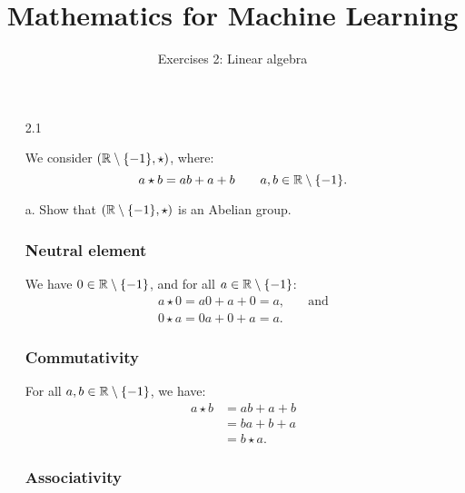 \documentclass[11pt]{article}
\title{Mathematics for Machine Learning}
\subtitle{Exercises 2: Linear algebra}
\author{}
\date{}
\begin{document}
\maketitle

\vspace{-6em}
\begin{figure}[h]
    \centering
    
\end{figure}
\vspace{1em}

\begin{enumerate}

    \item[2.1]

          We consider $\left( \mathbb{R} \setminus \{-1\}, \star \right)$, where:
          \[
              a \star b = ab + a + b \qquad a, b \in \mathbb{R} \setminus \{-1\}.
          \]

    \item[a.] Show that $\left( \mathbb{R} \setminus \{-1\}, \star \right)$ is an Abelian group.

          \subsubsection*{Neutral element}

          We have $0 \in \mathbb{R} \setminus \{-1\}$, and for all $a \in \mathbb{R} \setminus \{-1\}$:
          \[
              \begin{aligned}
                  a \star 0 = a0 + a + 0 = a, & \quad \textrm{and} \\
                  0 \star a = 0a + 0 + a = a.
              \end{aligned}
          \]

          \subsubsection*{Commutativity}

          For all $a, b \in \mathbb{R} \setminus \{-1\}$, we have:
          \[
              \begin{aligned}
                  a \star b & = ab + a + b \\
                            & = ba + b + a \\
                            & = b \star a.
              \end{aligned}
          \]

          \subsubsection*{Associativity}


\end{enumerate}
\end{document}
